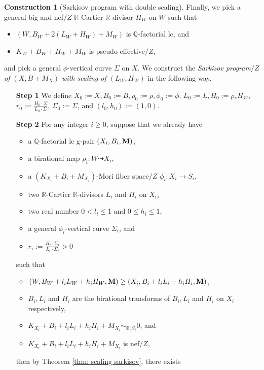 \documentclass[11pt]{amsart}
\numberwithin{equation}{section}
\newcommand{\Mm}{{\bf{M}}}
\newcommand{\Qq}{\mathbb{Q}}
\newcommand{\Rr}{\mathbb{R}}
\theoremstyle{definition}
\theoremstyle{definition}
\newtheorem{cons}[thm]{Construction}
\theoremstyle{definition}
\begin{document}
\begin{cons}[Sarkisov program with double scaling]
 Finally, we pick a general big and nef$/Z$ $\mathbb{R}$-Cartier $\Rr$-divisor $H_W$ on $W$ such that
\begin{itemize}
\item $(W,B_W+2(L_W+H_W)+M_W)$ is $\Qq$-factorial lc, and
    \item $K_W+B_W+H_W+M_W$ is pseudo-effective$/Z$, 
\end{itemize}
and pick a general $\phi$-vertical curve $\Sigma$ on $X$. We construct the \emph{Sarkisov program$/Z$ of $(X,B+M_{X})$ with scaling of $(L_W,H_W)$} in the following way. 
\begin{itemize}
    \item[\textbf{Step 1}] We define $X_0:=X,B_0:=B,\rho_0:=\rho,\phi_0:=\phi$, $L_0:=L, H_0:=\rho_*H_W$, $r_0:=\frac{H_0\cdot\Sigma}{L_0\cdot\Sigma}$, $\Sigma_0:=\Sigma$, and $(l_0,h_0):=(1,0)$.
    \item[\textbf{Step 2}] For any integer $i\geq 0$, suppose that we already have
    \begin{itemize}
        \item a $\Qq$-factorial lc g-pair $(X_i,B_i,\Mm)$,
        \item a birational map $\rho_i: W\dashrightarrow X_i$,
        \item a $(K_{X_i}+B_i+M_{X_i})$-Mori fiber space$/Z$ $\phi_i: X_i\rightarrow S_i$,
        \item two $\Rr$-Cartier $\Rr$-divisors $L_i$ and $H_i$ on $X_i$, 
            \item two real number $0<l_i\leq 1$ and $0\leq h_i\leq 1$, 
            \item a general $\phi_i$-vertical curve $\Sigma_i$, and
            \item $r_i:=\frac{H_i\cdot\Sigma_i}{L_i\cdot\Sigma_i}>0$
    \end{itemize}
    such that
    \begin{itemize}
        \item $(W,B_W+l_iL_W+h_iH_W,\Mm)\geq (X_i,B_i+l_iL_i+h_iH_i,\Mm)$,
        \item $B_i,L_i$ and $H_i$ are the birational transforms of $B_i,L_i$ and $H_i$ on $X_i$ respectively,
        \item $K_{X_i}+B_i+l_iL_i+h_iH_i+M_{X_i}\sim_{\Rr,S_i}0$, and
        \item $K_{X_i}+B_i+l_iL_i+h_iH_i+M_{X_i}$ is nef$/Z$,
    \end{itemize}
    then by Theorem \ref{thm: scaling sarkisov}, there exists 
    \begin{itemize}

\end{itemize}
\end{itemize}
\end{cons}
\end{document}
